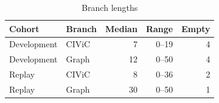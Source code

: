 \begin{table}[t]
\centering
\caption{Branch lengths}
\label{tab:lengths}
\small
\setlength{\tabcolsep}{3.5pt}
\begin{tabular}{llrrr}
\toprule
Cohort & Branch & Median & Range & Empty \\
\midrule
Development & CIViC & 7 & 0--19 & 4 \\
Development & Graph & 12 & 0--50 & 4 \\
Replay & CIViC & 8 & 0--36 & 2 \\
Replay & Graph & 30 & 0--50 & 1 \\
\bottomrule
\end{tabular}
\end{table}
